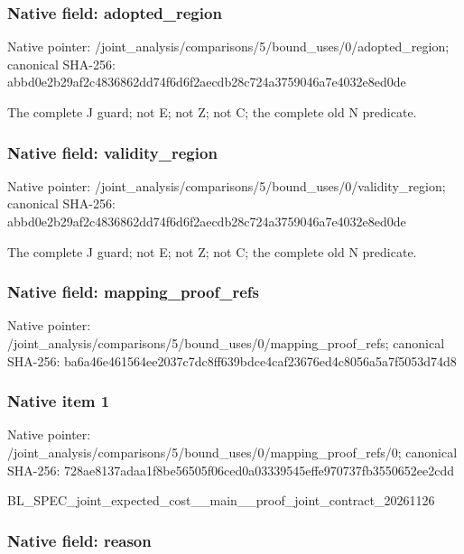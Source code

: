 \documentclass[10pt,a4paper]{article}
\begin{document}
\subsubsection{Native field: adopted\_region}


Native pointer: /joint\_analysis/comparis\allowbreak{}ons/5/bound\_uses/0/adopt\allowbreak{}ed\_region; canonical SHA-256: abbd0e2b29af2c4836862dd7\allowbreak{}4f6d6f2aecdb28c724a37590\allowbreak{}46a7e4032e8ed0de


The complete J guard; not E; not Z; not C; the complete old N predicate.


\subsubsection{Native field: validity\_region}


Native pointer: /joint\_analysis/comparis\allowbreak{}ons/5/bound\_uses/0/valid\allowbreak{}ity\_region; canonical SHA-256: abbd0e2b29af2c4836862dd7\allowbreak{}4f6d6f2aecdb28c724a37590\allowbreak{}46a7e4032e8ed0de


The complete J guard; not E; not Z; not C; the complete old N predicate.


\subsubsection{Native field: mapping\_proof\_refs}


Native pointer: /joint\_analysis/comparis\allowbreak{}ons/5/bound\_uses/0/mappi\allowbreak{}ng\_proof\_refs; canonical SHA-256: ba6a46e461564ee2037c7dc8\allowbreak{}ff639bdce4caf23676ed4c80\allowbreak{}56a5a7f5053d74d8



\subsubsection{Native item 1}


Native pointer: /joint\_analysis/comparis\allowbreak{}ons/5/bound\_uses/0/mappi\allowbreak{}ng\_proof\_refs/0; canonical SHA-256: 728ae8137adaa1f8be56505f\allowbreak{}06ced0a03339545effe97073\allowbreak{}7fb3550652ee2cdd


BL\_SPEC\_joint\_expected\_c\allowbreak{}ost\_\_main\_\_proof\_joint\_c\allowbreak{}ontract\_20261126


\subsubsection{Native field: reason}
\end{document}
